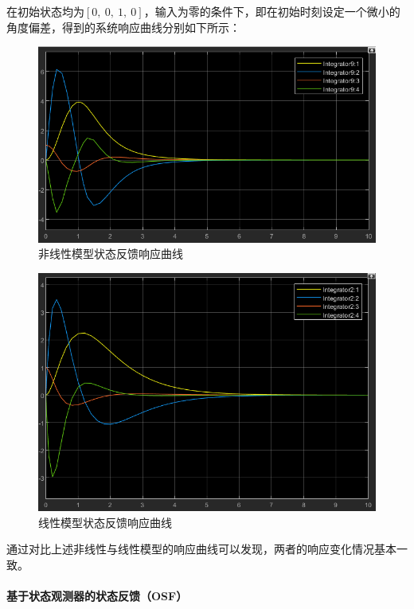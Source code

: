 \documentclass[UTF8]{article}
\begin{document}
在初始状态均为$[0,\ 0,\ 1,\ 0]$，输入为零的条件下，即在初始时刻设定一个微小的角度偏差，得到的系统响应曲线分别如下所示：
\begin{figure}[H]
    \centering %
    \includegraphics[width=.6\textwidth]{figure/倒立摆-非线性模型-状态反馈-响应曲线.png} 
    \caption{非线性模型状态反馈响应曲线} %
\end{figure}
\begin{figure}[H]
    \centering %
    \includegraphics[width=.6\textwidth]{figure/倒立摆-线性模型-状态反馈-响应曲线.png} 
    \caption{线性模型状态反馈响应曲线} %
\end{figure}

通过对比上述非线性与线性模型的响应曲线可以发现，两者的响应变化情况基本一致。

\paragraph{基于状态观测器的状态反馈（OSF）}~{}
\end{document}
